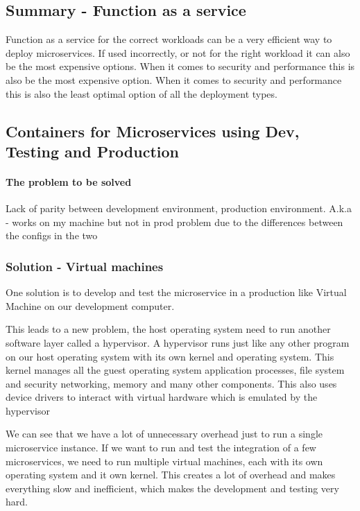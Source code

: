 \documentclass[a4paper, 11pt]{book}
\begin{document}
    \subsection{Summary - Function as a service}
    Function as a service for the correct workloads can be a very efficient way to deploy microservices.
    If used incorrectly, or not for the right workload it can also be the most expensive options.
    When it comes to security and performance this is also be the most expensive option.
    When it comes to security and performance this is also the least optimal option of all the deployment types.

    \subsection{Containers for Microservices using Dev, Testing and Production}

    \paragraph{The problem to be solved}
    Lack of parity between development environment, production environment.
    A.k.a - works on my machine but not in prod problem due to the differences between the configs in the two

    \subsubsection{Solution - Virtual machines}
    One solution is to develop and test the microservice in a production like Virtual Machine on our development computer.

    This leads to a new problem, the host operating system need to run another software layer called a hypervisor.
    A hypervisor runs just like any other program on our host operating system with its own kernel and operating system.
    This kernel manages all the guest operating system application processes, file system and security networking, memory and many other components.
    This also uses device drivers to interact with virtual hardware which is emulated by the hypervisor

    We can see that we have a lot of unnecessary overhead just to run a single microservice instance.
    If we want to run and test the integration of a few microservices, we need to run multiple virtual machines, each with its own operating system and it own kernel.
    This creates a lot of overhead and makes everything slow and inefficient, which makes the development and testing very hard.
\end{document}
